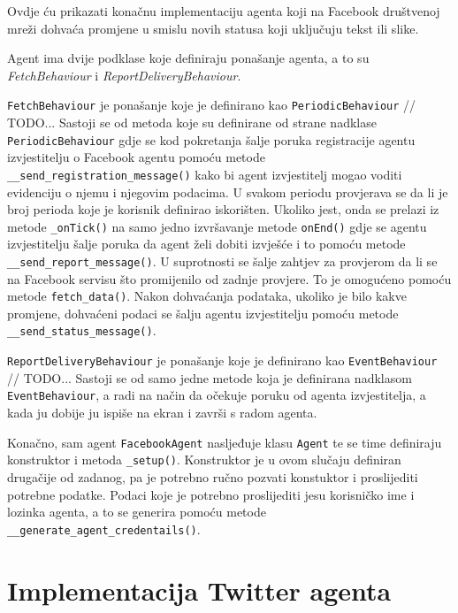 \documentclass[a4paper,12pt]{foi}
\begin{document}
Ovdje ću prikazati konačnu implementaciju agenta koji na Facebook društvenoj mreži dohvaća promjene u smislu novih statusa koji uključuju tekst ili slike.

\lstset{commentstyle=\textit,language=python}


Agent ima dvije podklase koje definiraju ponašanje agenta, a to su \textit{FetchBehaviour} i \textit{ReportDeliveryBehaviour}.

\texttt{FetchBehaviour} je ponašanje koje je definirano kao \texttt{PeriodicBehaviour} // TODO... Sastoji se od metoda koje su definirane od strane nadklase \texttt{PeriodicBehaviour} gdje se kod pokretanja šalje poruka registracije agentu izvjestitelju o Facebook agentu pomoću metode \texttt{\_\_send\_registration\_message()}  kako bi agent izvjestitelj mogao voditi evidenciju o njemu i njegovim podacima. U svakom periodu provjerava se da li je broj perioda koje je korisnik definirao iskorišten. Ukoliko jest, onda se prelazi iz metode \texttt{\_onTick()} na samo jedno izvršavanje metode \texttt{onEnd()} gdje se agentu izvjestitelju šalje poruka da agent želi dobiti izvješće i to pomoću metode \texttt{\_\_send\_report\_message()}. U suprotnosti se šalje zahtjev za provjerom da li se na Facebook servisu što promijenilo od zadnje provjere. To je omogućeno pomoću metode \texttt{fetch\_data()}. Nakon dohvaćanja podataka, ukoliko je bilo kakve promjene, dohvaćeni podaci se šalju agentu izvjestitelju pomoću metode \texttt{\_\_send\_status\_message()}.

\texttt{ReportDeliveryBehaviour} je ponašanje koje je definirano kao \texttt{EventBehaviour} // TODO... Sastoji se od samo jedne metode koja je definirana nadklasom \texttt{EventBehaviour}, a radi na način da očekuje poruku od agenta izvjestitelja, a kada ju dobije ju ispiše na ekran i završi s radom agenta.

Konačno, sam agent \texttt{FacebookAgent} nasljeđuje klasu \texttt{Agent} te se time definiraju konstruktor i metoda \texttt{\_setup()}. Konstruktor je u ovom slučaju definiran drugačije od zadanog, pa je potrebno ručno pozvati konstuktor i proslijediti potrebne podatke. Podaci koje je potrebno proslijediti jesu korisničko ime i lozinka agenta, a to se generira pomoću metode \texttt{\_\_generate\_agent\_credentails()}.

\section{Implementacija Twitter agenta}
\end{document}

